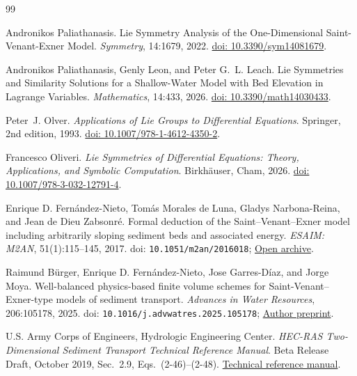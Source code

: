 \documentclass[12pt,a4paper,oneside]{report}
\numberwithin{equation}{chapter}
\theoremstyle{definition}
\theoremstyle{remark}\newtheorem{remark}[theorem]{Remark}
\begin{document}
\begin{thebibliography}{99}

Andronikos Paliathanasis. Lie Symmetry Analysis of the One-Dimensional Saint-Venant-Exner Model. \emph{Symmetry}, 14:1679, 2022. \href{https://www.mdpi.com/2073-8994/14/8/1679}{doi: 10.3390/sym14081679}.

Andronikos Paliathanasis, Genly Leon, and Peter G.~L. Leach. Lie Symmetries and Similarity Solutions for a Shallow-Water Model with Bed Elevation in Lagrange Variables. \emph{Mathematics}, 14:433, 2026. \href{https://www.mdpi.com/2227-7390/14/3/433}{doi: 10.3390/math14030433}.

Peter~J. Olver. \emph{Applications of Lie Groups to Differential Equations}. Springer, 2nd edition, 1993. \href{https://link.springer.com/book/10.1007/978-1-4612-4350-2}{doi: 10.1007/978-1-4612-4350-2}.

Francesco Oliveri. \emph{Lie Symmetries of Differential Equations: Theory, Applications, and Symbolic Computation}. Birkh\"auser, Cham, 2026. \href{https://link.springer.com/book/10.1007/978-3-032-12791-4}{doi: 10.1007/978-3-032-12791-4}.

Enrique D. Fern\'andez-Nieto, Tom\'as Morales de Luna, Gladys Narbona-Reina, and Jean de Dieu Zabsonr\'e. Formal deduction of the Saint--Venant--Exner model including arbitrarily sloping sediment beds and associated energy. \emph{ESAIM: M2AN}, 51(1):115--145, 2017. doi: \nolinkurl{10.1051/m2an/2016018}; \href{https://www.numdam.org/item/M2AN_2017__51_1_115_0/}{Open archive}.

Raimund B\"urger, Enrique D. Fern\'andez-Nieto, Jose Garres-D\'iaz, and Jorge Moya. Well-balanced physics-based finite volume schemes for Saint-Venant--Exner-type models of sediment transport. \emph{Advances in Water Resources}, 206:105178, 2025. doi: \nolinkurl{10.1016/j.advwatres.2025.105178}; \href{https://www.ci2ma.udec.cl/pdf/pre-publicaciones2/2025/pp25-18.pdf}{Author preprint}.

U.S. Army Corps of Engineers, Hydrologic Engineering Center. \emph{HEC-RAS Two-Dimensional Sediment Transport Technical Reference Manual}. Beta Release Draft, October 2019, Sec.~2.9, Eqs.~(2-46)--(2-48). \href{https://www.hec.usace.army.mil/software/hec-ras/documentation/HEC-RAS_2DSedimentTechnicalReference_(BetaReleaseDraft).pdf}{Technical reference manual}.


\end{thebibliography}
\end{document}
